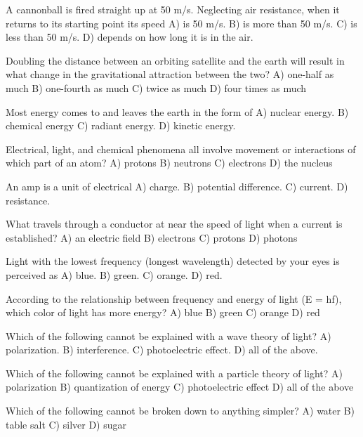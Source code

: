 
A cannonball is fired straight up at 50 m/s.
Neglecting air resistance, when it returns to its starting point its speed
    A)  is 50 m/s.
    B)  is more than 50 m/s.
    C)  is less than 50 m/s.
    D)  depends on how long it is in the air.

Doubling the distance between an orbiting satellite and the earth will result in what change in the gravitational attraction between the two?
    A)  one-half as much
    B)  one-fourth as much
    C)  twice as much
    D)  four times as much

Most energy comes to and leaves the earth in the form of
    A)  nuclear energy.
    B)  chemical energy
    C)  radiant energy.
    D)  kinetic energy.






Electrical, light, and chemical phenomena all involve movement or interactions of which part of an atom?
    A)  protons
    B)  neutrons
    C)  electrons
    D)  the nucleus

An amp is a unit of electrical
    A)  charge.
    B)  potential difference.
    C)  current.
    D)  resistance.

What travels through a conductor at near the speed of light when a current is established?
    A)  an electric field
    B)  electrons
    C)  protons
    D)  photons

Light with the lowest frequency (longest wavelength) detected by your eyes is perceived as
    A)  blue.
    B)  green.
    C)  orange.
    D)  red.

According to the relationship between frequency and energy of light (E = hf), which color of light has more energy?
    A)  blue
    B)  green
    C)  orange
    D)  red

Which of the following cannot be explained with a wave theory of light?
    A)  polarization.
    B)  interference.
    C)  photoelectric effect.
    D)  all of the above.

Which of the following cannot be explained with a particle theory of light?
    A)  polarization
    B)  quantization of energy
    C)  photoelectric effect
    D)  all of the above

Which of the following cannot be broken down to anything simpler?
    A)  water
    B)  table salt
    C)  silver
    D)  sugar

